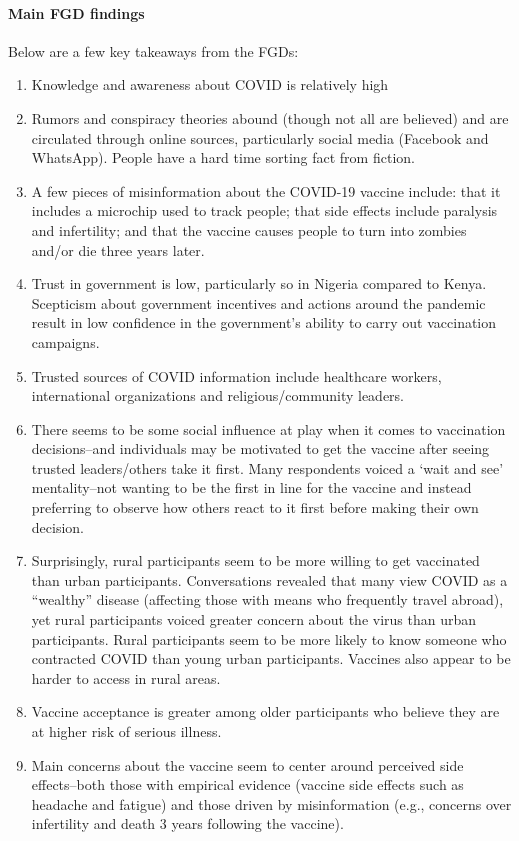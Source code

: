 \documentclass[letterpaper, 12pt, parskip=full,DIV=10]{scrartcl}
\begin{document}
\paragraph{Main FGD findings}

Below are a few key takeaways from the FGDs:
\begin{enumerate}
\item Knowledge and awareness about COVID is relatively high
\item Rumors and conspiracy theories abound (though not all are believed) and are circulated through online sources, particularly social media (Facebook and WhatsApp). People have a hard time sorting fact from fiction. 
\item A few pieces of misinformation about the COVID-19 vaccine include: that it includes a microchip used to track people; that side effects include paralysis and infertility; and that the vaccine causes people to turn into zombies and/or die three years later.
\item Trust in government is low, particularly so in Nigeria compared to Kenya. Scepticism about government incentives and actions around the pandemic result in low confidence in the government’s ability to carry out vaccination campaigns.
\item Trusted sources of COVID information include healthcare workers, international organizations and religious/community leaders. 
\item There seems to be some social influence at play when it comes to vaccination decisions--and individuals may be motivated to get the vaccine after seeing trusted leaders/others take it first. Many respondents voiced a ‘wait and see’ mentality--not wanting to be the first in line for the vaccine and instead preferring to observe how others react to it first before making their own decision.
\item Surprisingly, rural participants seem to be more willing to get vaccinated than urban participants. Conversations revealed that many view COVID as a “wealthy” disease (affecting those with means who frequently travel abroad), yet rural participants voiced greater concern about the virus than urban participants. Rural participants seem to be more likely to know someone who contracted COVID than young urban participants. Vaccines also appear to be harder to access in rural areas.
\item Vaccine acceptance is greater among older participants who believe they are at higher risk of serious illness.
\item Main concerns about the vaccine seem to center around perceived side effects--both those with empirical evidence (vaccine side effects such as headache and fatigue) and those driven by misinformation (e.g., concerns over infertility and death 3 years following the vaccine).
\end{enumerate}
\end{document}
